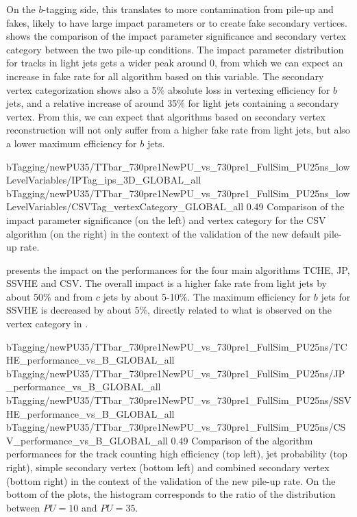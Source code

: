     On the $b$-tagging side, this translates to more contamination from pile-up and
    fakes, likely to have large impact parameters or to create fake secondary vertices.
     shows the comparison of the impact
    parameter significance and secondary vertex category between the two pile-up conditions.
    The impact parameter distribution for tracks in light jets gets a wider peak around
    0, from which we can expect an increase in fake rate for all algorithm based on
    this variable. The secondary vertex categorization shows also a 5\% absolute loss
    in vertexing efficiency for $b$ jets, and a relative increase of around 35\% for light
    jets containing a secondary vertex. From this, we can expect that algorithms based
    on secondary vertex reconstruction will not only suffer from a higher fake rate from
    light jets, but also a lower maximum efficiency for $b$ jets.

                     {bTagging/newPU35/TTbar_730pre1NewPU_vs_730pre1_FullSim_PU25ns_lowLevelVariables/IPTag_ips_3D_GLOBAL_all}
                     {bTagging/newPU35/TTbar_730pre1NewPU_vs_730pre1_FullSim_PU25ns_lowLevelVariables/CSVTag_vertexCategory_GLOBAL_all}
                     {0.49}
                     {Comparison of the impact parameter significance (on the left)
                     and vertex category for the CSV algorithm (on the right) in the
                     context of the validation of the new default pile-up rate.}

     presents the impact on the performances
    for the four main algorithms TCHE, JP, SSVHE and CSV. The overall impact is a higher
    fake rate from light jets by about 50\% and from $c$ jets by about 5-10\%. The
    maximum efficiency for $b$ jets for SSVHE is decreased by about 5\%, directly
    related to what is observed on the vertex category in .

                      {bTagging/newPU35/TTbar_730pre1NewPU_vs_730pre1_FullSim_PU25ns/TCHE_performance_vs_B_GLOBAL_all}
                      {bTagging/newPU35/TTbar_730pre1NewPU_vs_730pre1_FullSim_PU25ns/JP_performance_vs_B_GLOBAL_all}
                      {bTagging/newPU35/TTbar_730pre1NewPU_vs_730pre1_FullSim_PU25ns/SSVHE_performance_vs_B_GLOBAL_all}
                      {bTagging/newPU35/TTbar_730pre1NewPU_vs_730pre1_FullSim_PU25ns/CSV_performance_vs_B_GLOBAL_all}
                      {0.49}
                      {Comparison of the algorithm performances for the track counting high
                      efficiency (top left), jet probability (top right), simple
                      secondary vertex (bottom left) and combined secondary vertex
                      (bottom right) in the context of the validation of the new pile-up
                      rate. On the bottom of the plots, the histogram corresponds
                      to the ratio of the distribution between $PU = 10$ and $PU = 35$.}

